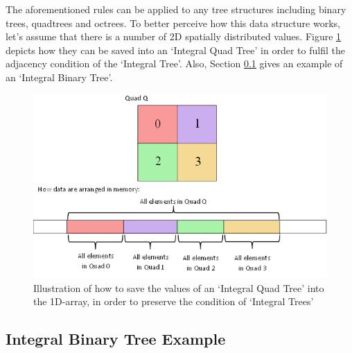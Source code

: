 \documentclass{subfiles}
\begin{document}
\par The aforementioned rules can be applied to any tree structures including binary trees, quadtrees and octrees. To better perceive how this data structure works, let’s assume that there is a number of 2D spatially distributed values. Figure  \ref{fig:IntegralTreeQuads} depicts how they can be saved into an `Integral Quad Tree' in order to fulfil the adjacency condition of the `Integral Tree'. Also, Section {\ref{sec:IntegralBinaryTree}} gives an example of an `Integral Binary Tree'.

\begin{figure}[!htbp]
	\centering
	\includegraphics[width=5.4in]{img/IntegralTree}
	\caption{Illustration of how to save the values of an `Integral Quad Tree' into the 1D-array, in order to preserve the condition of `Integral Trees'}
	\label{fig:IntegralTreeQuads}
\end{figure}


\subsection{Integral Binary Tree Example}\label{sec:IntegralBinaryTree}
\end{document}

